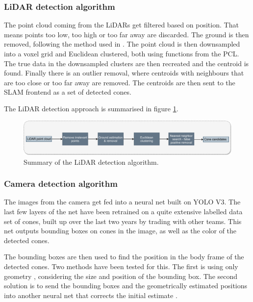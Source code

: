 \subsubsection{LiDAR detection algorithm}
The point cloud coming from the \glspl{LiDAR} get filtered based on position. That means points too low, too high or too far away are discarded. The ground is then removed, following the method used in \cite{GroundRemoval}. The point cloud is then downsampled into a voxel grid and Euclidean clustered, both using functions from the \gls{PCL}\cite{PCL}. The true data in the downsampled clusters are then recreated and the centroid is found. Finally there is an outlier removal, where centroids with neighbours that are too close or too far away are removed. The centroids are then sent to the \gls{SLAM} frontend as a set of detected cones.

The \gls{LiDAR} detection approach is summarised in figure \ref{Fig:LiDARApproach}.

\begin{figure}
    \centering
    \includegraphics[width=\linewidth]{0_Images/3_Background/LiDARApproach.pdf}
    \caption[Summary of the LiDAR detection algorithm.]{Summary of the LiDAR detection algorithm.}
    \label{Fig:LiDARApproach}
\end{figure}

\subsubsection{Camera detection algorithm}

The images from the camera get fed into a neural net built on \gls{YOLO} V3\cite{YOLOV3}. The last few layers of the net have been retrained on a quite extensive labelled data set of cones, built up over the last two years by trading with other teams. This net outputs bounding boxes on cones in the image, as well as the color of the detected cones. 

The bounding boxes are then used to find the position in the body frame of the detected cones. Two methods have been tested for this. The first is using only geometry \cite{BBGeometry}, considering the size and position of the bounding box. The second solution is to send the bounding boxes and the geometrically estimated positions into another neural net that corrects the initial estimate \cite{PosNeuralNetCorrection}. 

